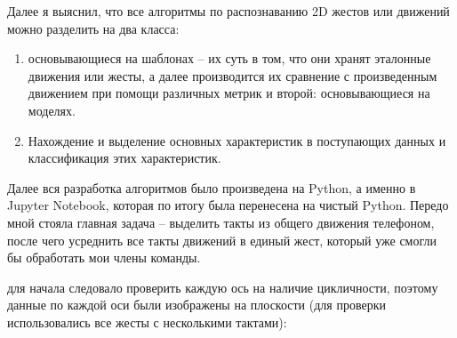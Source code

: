 Далее я выяснил, что все алгоритмы по распознаванию 2D жестов или движений можно разделить на два класса:
\begin{enumerate}
    \item основывающиеся на шаблонах – их суть в том, что они хранят эталонные движения или жесты, а далее производится их сравнение с произведенным движением при помощи различных метрик и второй: основывающиеся на моделях.
    \item Нахождение и выделение основных характеристик в поступающих данных и классификация этих характеристик.
\end{enumerate}

Далее вся разработка алгоритмов было произведена на Python, а именно в Jupyter Notebook, которая по итогу была перенесена на чистый Python.
Передо мной стояла главная задача -- выделить такты из общего движения телефоном, после чего усреднить все такты движений в единый жест, который уже смогли бы обработать мои члены команды.

для начала следовало проверить каждую ось на наличие цикличности, поэтому данные по каждой оси были изображены на плоскости (для проверки использовались все жесты с несколькими тактами):
\begin{figure}[H]
\end{figure}

